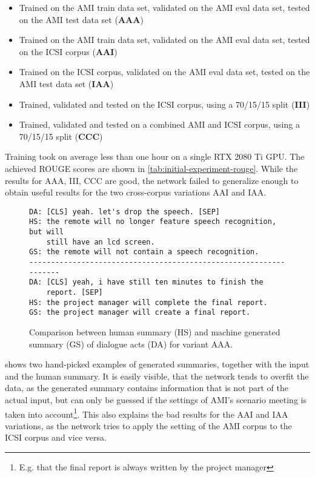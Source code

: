 \begin{itemize}
\item Trained on the AMI train data set, validated on the AMI eval data set, tested on the AMI test data set (\textbf{AAA})
\item Trained on the AMI train data set, validated on the AMI eval data set, tested on the ICSI corpus (\textbf{AAI})
\item Trained on the ICSI corpus, validated on the AMI eval data set, tested on the AMI test data set (\textbf{IAA})
\item Trained, validated and tested on the ICSI corpus, using a 70/15/15 split (\textbf{III})
\item Trained, validated and tested on a combined AMI and ICSI corpus, using a 70/15/15 split (\textbf{CCC})
\end{itemize}


Training took on average less than one hour on a single RTX 2080 Ti GPU.
The achieved ROUGE scores are shown in \cref{tab:initial-experiment-rouge}.
While the results for AAA, III, CCC are good, the network failed to generalize enough to obtain useful results for the two cross-corpus variations AAI and IAA.

\begin{figure}[h]
\begin{lstlisting}[numbers=none]
DA: [CLS] yeah. let's drop the speech. [SEP]
HS: the remote will no longer feature speech recognition, but will
    still have an lcd screen.
GS: the remote will not contain a speech recognition.
------------------------------------------------------------------
DA: [CLS] yeah, i have still ten minutes to finish the 
    report. [SEP]
HS: the project manager will complete the final report.
GS: the project manager will create a final report.
\end{lstlisting}
\caption{Comparison between human summary (HS) and machine generated summary (GS) of dialogue acts (DA) for variant AAA.}
\label{fig:initial-experiment-example}
\end{figure}

 shows two hand-picked examples of generated summaries, together with the input and the human summary.
It is easily visible, that the network tends to overfit the data, as the generated summary contains information that is not part of the actual input, but can only be guessed if the settings of AMI's scenario meeting is taken into account\footnote{E.g. that the final report is always written by the project manager}.
This also explains the bad results for the AAI and IAA variations, as the network tries to apply the setting of the AMI corpus to the ICSI corpus and vice versa.


